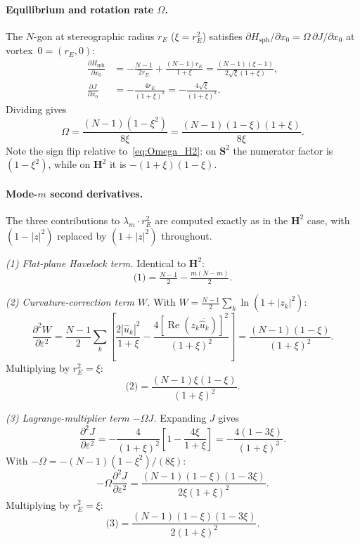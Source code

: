 \paragraph{Equilibrium and rotation rate $\Omega$.}
The $N$-gon at stereographic radius $r_E$ ($\xi = r_E^2$) satisfies
$\partial H_{\mathrm{sph}}/\partial x_0 = \Omega\,\partial J/\partial x_0$
at vortex~$0 = (r_E, 0)$:
\begin{align*}
  \frac{\partial H_{\mathrm{sph}}}{\partial x_0}
    &= -\frac{N-1}{2r_E} + \frac{(N-1)r_E}{1+\xi}
     = \frac{(N-1)(\xi - 1)}{2\sqrt{\xi}(1+\xi)}, \\
  \frac{\partial J}{\partial x_0}
    &= -\frac{4r_E}{(1+\xi)^2}
     = -\frac{4\sqrt{\xi}}{(1+\xi)^2}.
\end{align*}
Dividing gives
\begin{equation}\label{eq:Omega_S2}
  \Omega = \frac{(N-1)(1-\xi^2)}{8\xi}
         = \frac{(N-1)(1-\xi)(1+\xi)}{8\xi}.
\end{equation}
Note the sign flip relative to~\eqref{eq:Omega_H2}: on $\mathbf{S}^2$
the numerator factor is $(1-\xi^2)$, while on $\mathbf{H}^2$ it is
$-(1+\xi)(1-\xi)$.

\paragraph{Mode-$m$ second derivatives.}
The three contributions to $\lambda_m \cdot r_E^2$ are computed
exactly as in the $\mathbf{H}^2$ case, with $(1-|z|^2)$ replaced by
$(1+|z|^2)$ throughout.

\emph{(1) Flat-plane Havelock term.}  Identical to $\mathbf{H}^2$:
\[
  \text{(1)} = \tfrac{N-1}{2} - \tfrac{m(N-m)}{2}.
\]

\emph{(2) Curvature-correction term $W$.}
With $W = \tfrac{N-1}{2}\sum_k\ln(1+|z_k|^2)$:
\[
  \frac{\partial^2 W}{\partial\varepsilon^2}
  = \frac{N-1}{2}\sum_k\!\left[
    \frac{2|\hat u_k|^2}{1+\xi}
    - \frac{4[\operatorname{Re}(z_k\overline{\hat u_k})]^2}{(1+\xi)^2}
  \right]
  = \frac{(N-1)(1-\xi)}{(1+\xi)^2}.
\]
Multiplying by $r_E^2 = \xi$:
\[
  \text{(2)} = \frac{(N-1)\xi(1-\xi)}{(1+\xi)^2}.
\]

\emph{(3) Lagrange-multiplier term $-\Omega J$.}
Expanding $J$ gives
\[
  \frac{\partial^2 J}{\partial\varepsilon^2}
  = -\frac{4}{(1+\xi)^2}\!\left[1 - \frac{4\xi}{1+\xi}\right]
  = -\frac{4(1-3\xi)}{(1+\xi)^3}.
\]
With $-\Omega = -(N-1)(1-\xi^2)/(8\xi)$:
\[
  -\Omega\frac{\partial^2 J}{\partial\varepsilon^2}
  = \frac{(N-1)(1-\xi)(1-3\xi)}{2\xi(1+\xi)^2}.
\]
Multiplying by $r_E^2 = \xi$:
\[
  \text{(3)} = \frac{(N-1)(1-\xi)(1-3\xi)}{2(1+\xi)^2}.
\]

